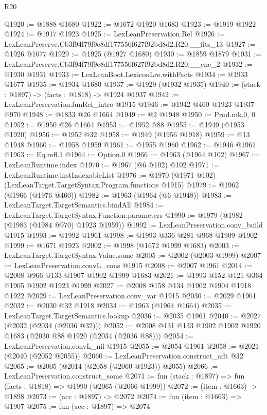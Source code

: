\begin{lexlean}{R20}
\begin{coremodule}
@1920 := @1888 @1680
@1922 := @1672 @1920 @1683
@1923 := @1919 @1922
@1924 := @1917 @1923
@1925 := LexLeanPreservation.Rel
@1926 := LexLeanPreserve.Cb3f94f79f9e8df177550f627f92bd8d2.R20.__fits_13
@1927 := @1926 @1677
@1929 := @1925 (@1927 @1680)
@1930 := @1859 @1879
@1931 := LexLeanPreserve.Cb3f94f79f9e8df177550f627f92bd8d2.R20.__enc_2
@1932 := @1930 @1931
@1933 := LexLeanBoot.LexiconLre.withFacts
@1934 := @1933 @1677
@1935 := @1934 @1680
@1937 := @1929 (@1932 @1935)
@1940 := (stack : @1897) -> (facts : @1818) -> @1924 @1937
@1942 := LexLeanPreservation.funRel_intro @1915
@1946 := @1942 @460 @1923 @1937 @970
@1948 := @1833 @26 @1664
@1949 := @2 @1948
@1950 := Prod.mk.{0, 0}
@1952 := @1950 @26 @1664
@1953 := @1952 @88
@1955 := @1949 (@1953 @1920)
@1956 := @1952 @32
@1958 := @1949 (@1956 @1918)
@1959 := @13 @1948
@1960 := @1958 @1959
@1961 := @1955 @1960
@1962 := @1946 @1961
@1963 := Eq.refl.{1}
@1964 := Option.{0}
@1966 := @1963 (@1964 @102)
@1967 := LexLeanRuntime.index
@1970 := @1967 (@6 @102) @102
@1971 := LexLeanRuntime.instIndexableList
@1976 := @1970 (@1971 @102) (LexLeanTarget.TargetSyntax.Program.functions @1915)
@1979 := @1962 (@1966 (@1976 @460))
@1982 := @1963 (@1964 (@6 @1948))
@1983 := LexLeanTarget.TargetSemantics.bindAll
@1984 := LexLeanTarget.TargetSyntax.Function.parameters
@1990 := @1979 (@1982 (@1983 (@1984 @970) @1923 @1959))
@1992 := LexLeanPreservation.conv_build @1915
@1993 := @1992 @1961
@1998 := @1993 @336 @281 @968 @1909 @1902
@1999 := @1671 @1923
@2002 := @1998 (@1672 @1999 @1683)
@2003 := LexLeanTarget.TargetSyntax.Value.some
@2005 := @2002 (@2003 @1999)
@2007 := LexLeanPreservation.convL_cons @1915
@2008 := @2007 @1961
@2014 := @2008 @966 @133 @1907 @1902 @1999 @1683
@2021 := @1993 @152 @121 @364 @1905 @1902 @1923 @1999
@2027 := @2008 @158 @134 @1902 @1904 @1918 @1922
@2029 := LexLeanPreservation.conv_var @1915
@2030 := @2029 @1961
@2032 := @2030 @32 @1918
@2034 := @1963 (@1964 @1664)
@2035 := LexLeanTarget.TargetSemantics.lookup
@2036 := @2035 @1961
@2040 := @2027 (@2032 (@2034 (@2036 @32)))
@2052 := @2008 @131 @133 @1902 @1902 @1920 @1683 (@2030 @88 @1920 (@2034 (@2036 @88)))
@2054 := LexLeanPreservation.convL_nil @1915
@2055 := @2054 @1961
@2058 := @2021 (@2040 (@2052 @2055))
@2060 := LexLeanPreservation.construct_adt @32
@2065 := @2005 (@2014 (@2058 (@2060 @1923)) @2055)
@2066 := LexLeanPreservation.construct_some
@2071 := fun (stack : @1897) => fun (facts : @1818) => @1990 (@2065 (@2066 @1999))
@2072 := (item : @1663) -> @1898
@2073 := (acc : @1897) -> @2072
@2074 := fun (item : @1663) => @1907
@2075 := fun (acc : @1897) => @2074

\end{coremodule}
\end{lexlean}
